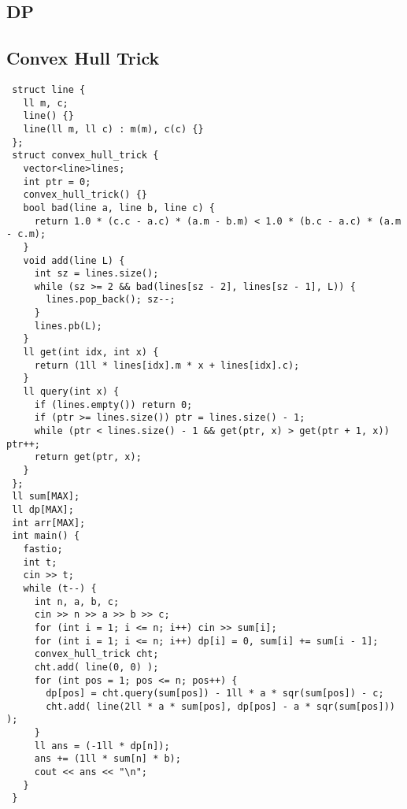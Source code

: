 \documentclass[FSZ,a4paper,onesided]{article}
\begin{document}
\begin{multicols*}{\COLS}
\section{DP}
\subsection{Convex Hull Trick}
\begin{lstlisting}
 struct line {
   ll m, c;
   line() {}
   line(ll m, ll c) : m(m), c(c) {}
 };
 struct convex_hull_trick {
   vector<line>lines;
   int ptr = 0;
   convex_hull_trick() {}
   bool bad(line a, line b, line c) {
     return 1.0 * (c.c - a.c) * (a.m - b.m) < 1.0 * (b.c - a.c) * (a.m - c.m);
   }
   void add(line L) {
     int sz = lines.size();
     while (sz >= 2 && bad(lines[sz - 2], lines[sz - 1], L)) {
       lines.pop_back(); sz--;
     }
     lines.pb(L);
   }
   ll get(int idx, int x) {
     return (1ll * lines[idx].m * x + lines[idx].c);
   }
   ll query(int x) {
     if (lines.empty()) return 0;
     if (ptr >= lines.size()) ptr = lines.size() - 1;
     while (ptr < lines.size() - 1 && get(ptr, x) > get(ptr + 1, x)) ptr++;
     return get(ptr, x);
   }
 };
 ll sum[MAX];
 ll dp[MAX];
 int arr[MAX];
 int main() {
   fastio;
   int t;
   cin >> t;
   while (t--) {
     int n, a, b, c;
     cin >> n >> a >> b >> c;
     for (int i = 1; i <= n; i++) cin >> sum[i];
     for (int i = 1; i <= n; i++) dp[i] = 0, sum[i] += sum[i - 1];
     convex_hull_trick cht;
     cht.add( line(0, 0) );
     for (int pos = 1; pos <= n; pos++) {
       dp[pos] = cht.query(sum[pos]) - 1ll * a * sqr(sum[pos]) - c;
       cht.add( line(2ll * a * sum[pos], dp[pos] - a * sqr(sum[pos])) );
     }
     ll ans = (-1ll * dp[n]);
     ans += (1ll * sum[n] * b);
     cout << ans << "\n";
   }
 } 
\end{lstlisting}

\end{multicols*}
\end{document}
